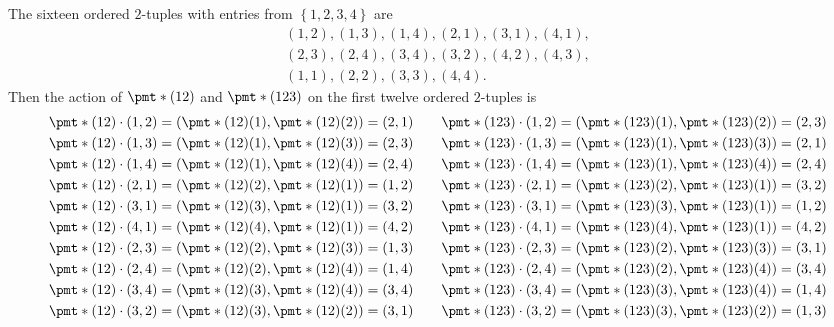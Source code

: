 \documentclass[11pt]{article}
\newcommand{\br}[1]{\left(#1\right)}
\newcommand{\cbr}[1]{\left\{#1\right\}}
\begin{document}
\begin{enumerate}
    The sixteen ordered $2$-tuples with entries from $\cbr{1,2,3,4}$ are \begin{align*}
      \br{1,2} , \br{1,3} , \br{1,4}, \br{2,1} , \br{3,1} , \br{4,1}, \\
      \br{2,3} , \br{2,4} , \br{3,4}, \br{3,2} , \br{4,2} , \br{4,3}, \\
      \br{1,1}, \br{2,2}, \br{3,3}, \br{4,4}.
    \end{align*} Then the action of $\pmt*{(12)}$ and $\pmt*{(123)}$ on the first twelve ordered $2$-tuples is \begin{alignat*}{2}
      \pmt*{(12)}\cdot \br{1,2} = \br{\pmt*{(12)}(1),\pmt*{(12)}(2)} = \br{2,1} \quad && \pmt*{(123)}\cdot \br{1,2} = \br{\pmt*{(123)}(1),\pmt*{(123)}(2)} = \br{2,3}\\
      \pmt*{(12)}\cdot \br{1,3} = \br{\pmt*{(12)}(1),\pmt*{(12)}(3)} = \br{2,3} \quad && \pmt*{(123)}\cdot \br{1,3} = \br{\pmt*{(123)}(1),\pmt*{(123)}(3)} = \br{2,1}\\
      \pmt*{(12)}\cdot \br{1,4} = \br{\pmt*{(12)}(1),\pmt*{(12)}(4)} = \br{2,4} \quad && \pmt*{(123)}\cdot \br{1,4} = \br{\pmt*{(123)}(1),\pmt*{(123)}(4)} = \br{2,4}\\
      \pmt*{(12)}\cdot \br{2,1} = \br{\pmt*{(12)}(2),\pmt*{(12)}(1)} = \br{1,2} \quad && \pmt*{(123)}\cdot \br{2,1} = \br{\pmt*{(123)}(2),\pmt*{(123)}(1)} = \br{3,2}\\
      \pmt*{(12)}\cdot \br{3,1} = \br{\pmt*{(12)}(3),\pmt*{(12)}(1)} = \br{3,2} \quad && \pmt*{(123)}\cdot \br{3,1} = \br{\pmt*{(123)}(3),\pmt*{(123)}(1)} = \br{1,2}\\
      \pmt*{(12)}\cdot \br{4,1} = \br{\pmt*{(12)}(4),\pmt*{(12)}(1)} = \br{4,2} \quad && \pmt*{(123)}\cdot \br{4,1} = \br{\pmt*{(123)}(4),\pmt*{(123)}(1)} = \br{4,2}\\
      \pmt*{(12)}\cdot \br{2,3} = \br{\pmt*{(12)}(2),\pmt*{(12)}(3)} = \br{1,3} \quad && \pmt*{(123)}\cdot \br{2,3} = \br{\pmt*{(123)}(2),\pmt*{(123)}(3)} = \br{3,1}\\
      \pmt*{(12)}\cdot \br{2,4} = \br{\pmt*{(12)}(2),\pmt*{(12)}(4)} = \br{1,4} \quad && \pmt*{(123)}\cdot \br{2,4} = \br{\pmt*{(123)}(2),\pmt*{(123)}(4)} = \br{3,4}\\
      \pmt*{(12)}\cdot \br{3,4} = \br{\pmt*{(12)}(3),\pmt*{(12)}(4)} = \br{3,4} \quad && \pmt*{(123)}\cdot \br{3,4} = \br{\pmt*{(123)}(3),\pmt*{(123)}(4)} = \br{1,4}\\
      \pmt*{(12)}\cdot \br{3,2} = \br{\pmt*{(12)}(3),\pmt*{(12)}(2)} = \br{3,1} \quad && \pmt*{(123)}\cdot \br{3,2} = \br{\pmt*{(123)}(3),\pmt*{(123)}(2)} = \br{1,3}\\

\end{alignat*}
\end{enumerate}
\end{document}
